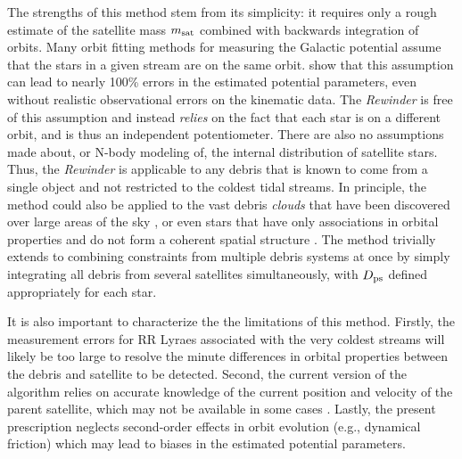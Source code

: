 \documentclass{emulateapj}
\begin{document}
The strengths of this method stem from its simplicity: it requires
only a rough estimate of the satellite mass $m_{\rm sat}$ combined
with backwards integration of orbits. Many orbit fitting methods for measuring the Galactic potential assume
that the stars in a given stream are on the same
orbit. \cite{sanders13a} show that this assumption can lead to nearly
100\% errors in the estimated potential parameters, even without
realistic observational errors on the kinematic data. The
\emph{Rewinder} is free of this assumption and instead \emph{relies}
on the fact that each star is on a different orbit, and is thus an
independent potentiometer. There are also no assumptions made
about, or N-body modeling of, the internal distribution of satellite
stars. Thus, the \emph{Rewinder} is applicable to any debris that is
known to come from a single object and not restricted to the coldest
tidal streams. In principle, the method could also be applied to the
vast debris {\it clouds} that have been discovered over large areas of
the sky \citep[e.g. the Triangulum Andromeda and Hercules-Aquila
  clouds]{rochapinto04,belokurov06}, or even stars that have only
associations in orbital properties and do not form a coherent spatial
structure \citep[such as the angular momentum groupings in local
  giants found by][]{helmi99}. The method trivially extends to
combining constraints from multiple debris systems at once by simply
integrating all debris from several satellites simultaneously, with
$D_{\rm ps}$ defined appropriately for each star.

It is also important to characterize the the limitations of this
method. Firstly, the measurement errors for RR Lyraes associated with
the very coldest streams \citep[e.g., the globular clusters Pal5 and
  GD1;][]{odenkirchen02,koposov10} will likely be too large to resolve
the minute differences in orbital properties between the debris and
satellite to be detected. Second, the current version of the algorithm
relies on accurate knowledge of the current position and velocity of
the parent satellite, which may not be available in some cases
\citep[for example, the Orphan Stream;][]{belokurov07}. Lastly, the
present prescription neglects second-order effects in orbit evolution (e.g.,
dynamical friction) which may lead to biases in
the estimated potential parameters.

\end{document}
